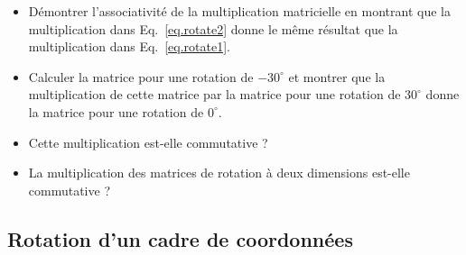 \begin{framed}
\begin{itemize}
\item Démontrer l'associativité de la multiplication matricielle en montrant que la multiplication dans Eq.~\ref{eq.rotate2} donne le même résultat que la multiplication dans Eq.~\ref{eq.rotate1}.
\item Calculer la matrice pour une rotation de $-30^{\circ}$ et montrer que la multiplication de cette matrice par la matrice pour une rotation de $30^{\circ}$ donne la matrice pour une rotation de $0^{\circ}$.
\item Cette multiplication est-elle commutative ?
\item La multiplication des matrices de rotation à deux dimensions est-elle commutative ?
\end{itemize}
\end{framed}

\subsection{Rotation d'un cadre de coordonnées}

